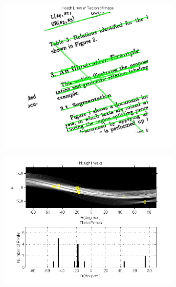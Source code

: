 \documentclass{report}
\begin{document}
\begin{figure}[H]%
\setcounter{subfigure}{0}
\centering
\begin{subfigure}{.5\columnwidth}
\includegraphics [width=\columnwidth]{HoughLinesEx.png}
\end{subfigure}
\hfill%
\begin{subfigure}{.5\columnwidth}
\includegraphics [width=\columnwidth]{HoughPeaksEx.png}
\end{subfigure}

\end{figure}
\end{document}
